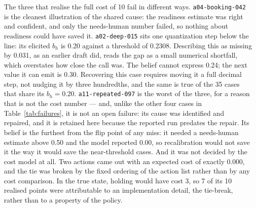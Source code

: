 \documentclass{article}
\begin{document}
The three that realise the full cost of 10 fail in different ways.
\texttt{a04-booking-042} is the cleanest illustration of the shared cause: the
readiness estimate was right and confident, and only the needs-human number
failed, so nothing about readiness could have saved it. \texttt{a02-deep-015} sits
one quantization step below the line: its elicited $b_h$ is 0.20 against a threshold
of 0.2308. Describing this as missing by 0.031, as an earlier draft did, reads the
gap as a small numerical shortfall, which overstates how close the call was. The
belief cannot express 0.24; the next value it can emit is 0.30. Recovering this case
requires moving it a full decimal step, not nudging it by three hundredths, and the
same is true of the 35 cases that share its $b_h = 0.20$. \texttt{a11-repeated-097}
is the worst of the three, for a reason that is not the cost number --- and, unlike
the other four cases in Table~\ref{tab:failures}, it is not an open failure: its
cause was identified and repaired, and it is retained here because the reported run
predates the repair. Its belief is the furthest from the flip point of any miss: it
needed a needs-human estimate above 0.50 and the model reported 0.00, so
recalibration would not save it the way it would save the near-threshold cases. And
it was not decided by the cost model at all. Two actions came out with an expected
cost of exactly 0.000, and the tie was broken by the fixed ordering of the action
list rather than by any cost comparison. In the true state, holding would have cost
3, so 7 of its 10 realised points were attributable to an implementation detail, the
tie-break, rather than to a property of the policy.
\end{document}
